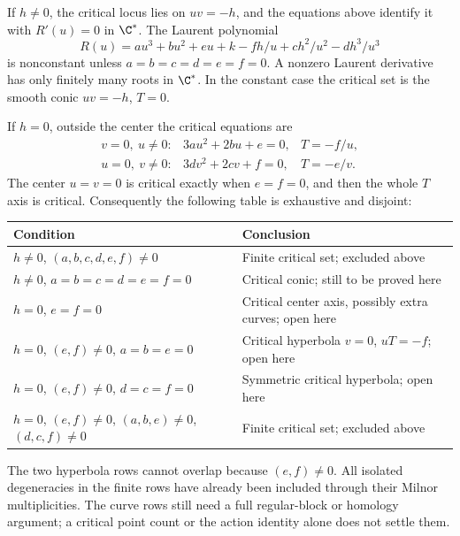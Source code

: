If $h\ne0$, the critical locus lies on $uv=-h$, and the equations
above identify it with $R'(u)=0$ in $\C^*$. The Laurent polynomial
\[
 R(u)=a u^3+b u^2+e u+k-fh/u+ch^2/u^2-dh^3/u^3
\]
is nonconstant unless $a=b=c=d=e=f=0$. A nonzero Laurent
derivative has only finitely many roots in $\C^*$. In the constant
case the critical set is the smooth conic $uv=-h$, $T=0$.

If $h=0$, outside the center the critical equations are
\[
 \begin{array}{lll}
 v=0,\ u\ne0:&3au^2+2bu+e=0,&T=-f/u,\\
 u=0,\ v\ne0:&3dv^2+2cv+f=0,&T=-e/v.
 \end{array}
\]
The center $u=v=0$ is critical exactly when $e=f=0$, and then
the whole $T$ axis is critical. Consequently the following table
is exhaustive and disjoint:
\begin{center}\small
\begin{tabular}{@{}p{}p{}@{}}
\toprule
Condition & Conclusion\\
\midrule
$h\ne0$, $(a,b,c,d,e,f)\ne0$ & Finite critical set; excluded above\\
$h\ne0$, $a=b=c=d=e=f=0$ & Critical conic; still to be proved here\\
$h=0$, $e=f=0$ & Critical center axis, possibly extra curves; open here\\
$h=0$, $(e,f)\ne0$, $a=b=e=0$ & Critical hyperbola $v=0$, $uT=-f$; open here\\
$h=0$, $(e,f)\ne0$, $d=c=f=0$ & Symmetric critical hyperbola; open here\\
$h=0$, $(e,f)\ne0$, $(a,b,e)\ne0$, $(d,c,f)\ne0$
 & Finite critical set; excluded above\\
\bottomrule
\end{tabular}
\end{center}
The two hyperbola rows cannot overlap because $(e,f)\ne0$.
All isolated degeneracies in the finite rows have already been
included through their Milnor multiplicities. The curve rows
still need a full regular-block or homology argument; a critical
point count or the action identity alone does not settle them.
